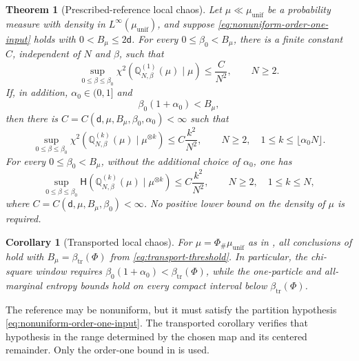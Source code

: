 \documentclass[11pt,reqno]{amsart}
\numberwithin{equation}{section}
\theoremstyle{plain}
\newtheorem{thm}{Theorem}[section]
\newtheorem{cor}[cor]{Corollary}
\theoremstyle{definition}
\renewcommand{\d}{\mathsf d}
\newcommand{\Q}{\mathbb Q}
\newcommand{\be}{\beta}
\newcommand{\al}{\alpha}
\newcommand{\Hr}{\mathsf H}
\newcommand{\muunif}{\mu_{\mathrm{unif}}}
\newcommand{\tr}{\mathrm{tr}}
\begin{document}
\begin{thm}[Prescribed-reference local chaos]
\label{thm:prescribed-local-chaos}
Let $\mu\ll\muunif$ be a probability measure with density in $L^\infty(\muunif)$, and suppose \eqref{eq:nonuniform-order-one-input} holds with $0<B_\mu\leq2\d$. For every $0\leq\be_0<B_\mu$, there is a finite constant $C$, independent of $N$ and $\be$, such that
\begin{equation}
 \sup_{0\leq\be\leq\be_0}
 \chi^2\!\left(\Q_{N,\be}^{(1)}(\mu)\mid\mu\right)
 \leq\frac{C}{N^2},\qquad N\geq2.
 \label{eq:prescribed-one-particle-chi}
\end{equation}
If, in addition, $\al_0\in(0,1]$ and
\begin{equation}
 \be_0(1+\al_0)<B_\mu,
 \label{eq:prescribed-local-window}
\end{equation}
then there is $C=C(\d,\mu,B_\mu,\be_0,\al_0)<\infty$ such that
\begin{equation}
 \sup_{0\leq\be\leq\be_0}
 \chi^2\!\left(\Q_{N,\be}^{(k)}(\mu)\mid\mu^{\otimes k}\right)
 \leq C\frac{k^2}{N^2},
 \qquad N\geq2,\quad 1\leq k\leq\lfloor\al_0N\rfloor.
 \label{eq:prescribed-local-chi}
\end{equation}
For every $0\leq\be_0<B_\mu$, without the additional choice of $\al_0$, one has
\begin{equation}
 \sup_{0\leq\be\leq\be_0}
 \Hr\!\left(\Q_{N,\be}^{(k)}(\mu)\mid\mu^{\otimes k}\right)
 \leq C\frac{k^2}{N^2},
 \qquad N\geq2,\quad 1\leq k\leq N,
 \label{eq:prescribed-all-entropy}
\end{equation}
where $C=C(\d,\mu,B_\mu,\be_0)<\infty$. No positive lower bound on the density of $\mu$ is required.
\end{thm}

\begin{cor}[Transported local chaos]
\label{cor:transported-local-chaos}
For $\mu=\Phi_\#\muunif$ as in , all conclusions of  hold with $B_\mu=\beta_{\tr}(\Phi)$ from \eqref{eq:transport-threshold}. In particular, the chi-square window requires $\be_0(1+\al_0)<\beta_{\tr}(\Phi)$, while the one-particle and all-marginal entropy bounds hold on every compact interval below $\beta_{\tr}(\Phi)$.
\end{cor}

The reference may be nonuniform, but it must satisfy the partition hypothesis \eqref{eq:nonuniform-order-one-input}. The transported corollary verifies that hypothesis in the range determined by the chosen map and its centered remainder. Only the order-one bound in  is used.
\end{document}
